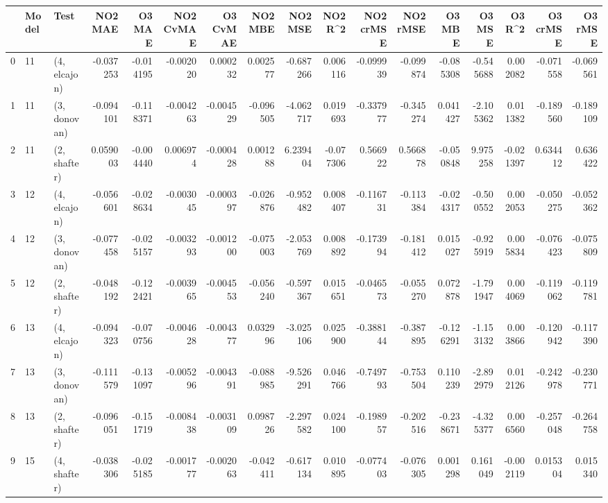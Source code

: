 \begin{tabular}{lllrrrrrrrrrrrrrr}
\toprule
{} & Model &          Test &   NO2 MAE &    O3 MAE &  NO2 CvMAE &  O3 CvMAE &   NO2 MBE &    NO2 MSE &   NO2 R\textasciicircum2 &  NO2 crMSE &  NO2 rMSE &    O3 MBE &     O3 MSE &    O3 R\textasciicircum2 &  O3 crMSE &   O3 rMSE \\
\midrule
0  &    11 &  (4, elcajon) & -0.037253 & -0.014195 &  -0.002020 &  0.000232 &  0.002577 &  -0.687266 &  0.006116 &  -0.099939 & -0.099874 & -0.085308 &  -0.545688 &  0.002082 & -0.071558 & -0.069561 \\
1  &    11 &  (3, donovan) & -0.094101 & -0.118371 &  -0.004263 & -0.004529 & -0.096505 &  -4.062717 &  0.019693 &  -0.337977 & -0.345274 &  0.041427 &  -2.105362 &  0.011382 & -0.189560 & -0.189109 \\
2  &    11 &  (2, shafter) &  0.059003 & -0.004440 &   0.006974 & -0.000428 &  0.001288 &   6.239404 & -0.077306 &   0.566922 &  0.566878 & -0.050848 &   9.975258 & -0.021397 &  0.634412 &  0.636422 \\
3  &    12 &  (4, elcajon) & -0.056601 & -0.028634 &  -0.003045 & -0.000397 & -0.026876 &  -0.952482 &  0.008407 &  -0.116731 & -0.113384 & -0.024317 &  -0.500552 &  0.002053 & -0.050275 & -0.052362 \\
4  &    12 &  (3, donovan) & -0.077458 & -0.025157 &  -0.003293 & -0.001200 & -0.075003 &  -2.053769 &  0.008892 &  -0.173994 & -0.181412 &  0.015027 &  -0.925919 &  0.005834 & -0.076423 & -0.075809 \\
5  &    12 &  (2, shafter) & -0.048192 & -0.122421 &  -0.003965 & -0.004553 & -0.056240 &  -0.597367 &  0.015651 &  -0.046573 & -0.055270 &  0.072878 &  -1.791947 &  0.004069 & -0.119062 & -0.119781 \\
6  &    13 &  (4, elcajon) & -0.094323 & -0.070756 &  -0.004628 & -0.004377 &  0.032996 &  -3.025106 &  0.025900 &  -0.388144 & -0.387895 & -0.126291 &  -1.153132 &  0.003866 & -0.120942 & -0.117390 \\
7  &    13 &  (3, donovan) & -0.111579 & -0.131097 &  -0.005296 & -0.004391 & -0.088985 &  -9.526291 &  0.046766 &  -0.749793 & -0.753504 &  0.110239 &  -2.892979 &  0.012126 & -0.242978 & -0.230771 \\
8  &    13 &  (2, shafter) & -0.096051 & -0.151719 &  -0.008438 & -0.003109 &  0.098726 &  -2.297582 &  0.024100 &  -0.198957 & -0.202516 & -0.238671 &  -4.325377 &  0.006560 & -0.257048 & -0.264758 \\
9  &    15 &  (4, shafter) & -0.038306 & -0.025185 &  -0.001777 & -0.002063 & -0.042411 &  -0.617134 &  0.010895 &  -0.077403 & -0.076305 &  0.001298 &   0.161049 & -0.002119 &  0.015304 &  0.015340 \\

\end{tabular}
